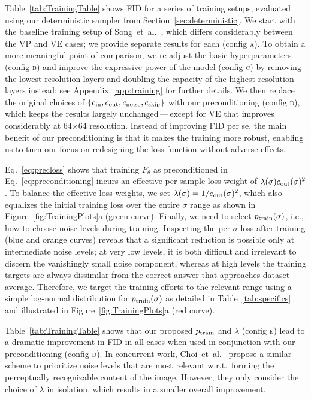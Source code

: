 \documentclass{article}
\begin{document}
\tabTrainingTable

Table~\ref{tab:TrainingTable} shows FID for a series of training setups, evaluated using our deterministic sampler from Section~\ref{sec:deterministic}.
We start with the baseline training setup of Song~et~al.~\cite{Song2021sde}, which differs considerably between the VP and VE cases; we provide separate results for each (config \textsc{a}).
To obtain a more meaningful point of comparison, we re-adjust the basic hyperparameters (config \textsc{b}) and improve the expressive power of the model (config \textsc{c}) by removing the lowest-resolution layers and doubling the capacity of the highest-resolution layers instead; see Appendix~{\ref{app:training}} for further details.
We then replace the original choices of $\{c_\text{in}, c_\text{out}, c_\text{noise}, c_\text{skip}\}$ with our preconditioning (config \textsc{d}), which keeps the results largely unchanged\,---\,except for VE that improves considerably at 64$\times$64 resolution.
Instead of improving FID per se, the main benefit of our preconditioning is that it makes the training more robust, enabling us to turn our focus on redesigning the loss function without adverse effects.


Eq.~\ref{eq:precloss} shows that training $F_\theta$ as preconditioned in Eq.~\ref{eq:preconditioning} incurs an effective per-sample loss weight of $\lambda(\sigma)c_\text{out}(\sigma)^2$.
To balance the effective loss weights, we set $\lambda(\sigma)=1/c_\text{out}(\sigma)^2$,
  which also equalizes the initial training loss over the entire $\sigma$ range as shown in Figure~\ref{fig:TrainingPlots}a (green curve).
Finally, we need to select $p_\text{train}(\sigma)$, i.e., how to choose noise levels during training.
Inspecting the per-$\sigma$ loss after training (blue and orange curves) reveals that a significant reduction is possible only at intermediate noise levels;
  at very low levels, it is both difficult and irrelevant to discern the vanishingly small noise component, 
  whereas at high levels the training targets are always dissimilar from the correct answer that approaches dataset average.
Therefore, we target the training efforts to the relevant range using a simple log-normal distribution for $p_\text{train}(\sigma)$ as detailed in Table~\ref{tab:specifics}
  and illustrated in Figure~\ref{fig:TrainingPlots}a (red curve).

Table~\ref{tab:TrainingTable} shows that our proposed $p_\text{train}$ and $\lambda$ (config \textsc{e}) lead to a dramatic improvement in FID in all cases when used in conjunction with our preconditioning (config \textsc{d}).
In concurrent work, Choi~et~al.~\cite{Choi2022} propose a similar scheme to prioritize noise levels that are most relevant w.r.t.~forming the perceptually recognizable content of the image.
However, they only consider the choice of $\lambda$ in isolation, which results in a smaller overall improvement.
\end{document}
